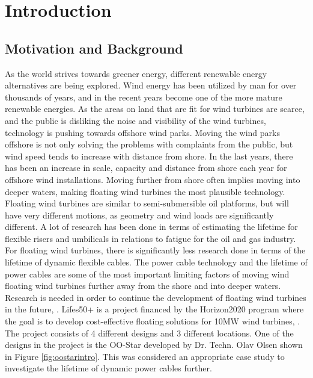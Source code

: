 \chapter{Introduction}
\label{chap:introduction}
\section{Motivation and Background}
As the world strives towards greener energy, different renewable energy alternatives are being explored. Wind energy has been utilized by man for over thousands of years, and in the recent years become one of the more mature renewable energies. As the areas on land that are fit for wind turbines are scarce, and the public is disliking the noise and visibility of the wind turbines, technology is pushing towards offshore wind parks. Moving the wind parks offshore is not only solving the problems with complaints from the public, but wind speed tends to increase with distance from shore. In the last years, there has been an increase in scale, capacity and distance from shore each year for offshore wind installations. Moving further from shore often implies moving into deeper waters, making floating wind turbines the most plausible technology. Floating wind turbines are similar to semi-submersible oil platforms, but will have very different motions, as geometry and wind loads are significantly different. A lot of research has been done in terms of estimating the lifetime for flexible risers and umbilicals in relations to fatigue for the oil and gas industry. For floating wind turbines, there is significantly less research done in terms of the lifetime of dynamic flexible cables. The power cable technology and the lifetime of power cables are some of the most important limiting factors of moving wind floating wind turbines further away from the shore and into deeper waters. Research is needed in order to continue the development of floating wind turbines in the future, \cite{Thies2012}. \newline
\newline
Lifes50+ is a project financed by the Horizon2020 program where the goal is to develop cost-effective floating solutions for 10MW wind turbines, \cite{Horizon2010}. The project consists of 4 different designs and 3 different locations. One of the designs in the project is the OO-Star developed by Dr. Techn. Olav Olsen shown in Figure \ref{fig:oostarintro}. This was considered an appropriate case study to investigate the lifetime of dynamic power cables further. 

